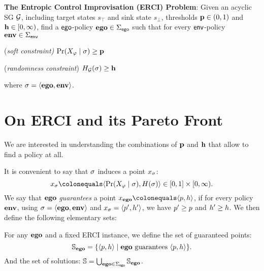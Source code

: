 {{{\begin{mdframed}
\textbf{The Entropic Control Improvisation (ERCI) Problem}:
Given an acyclic SG $\mathcal{G}$, including target states $s_\top$ and sink state $s_\bot$, thresholds $\mathbf{p} \in (0,1)$ and $\mathbf{h} \in [0,\infty)$,  find a $\mathsf{ego}$-policy $\mathbf{ego} \in \Sigma_{\mathsf{ego}}$  such that for every $\mathsf{env}$-policy $\mathbf{env} \in \Sigma_{\mathsf{env}}$ \begin{compactenum}
	\item (\emph{soft constraint)} $\Pr(X_\varphi \mid \sigma) \geq \mathbf{p}$
\item (\emph{randomness constraint}) $H_{\mathcal{G}}(\sigma) \geq \mathbf{h}$
\end{compactenum}
where  $\sigma = \langle \mathbf{ego}, \mathbf{env} \rangle$.
\end{mdframed}

\begin{example}
	
\end{example}


\section{On ERCI and its Pareto Front}

We are interested in understanding the combinations of $\mathbf{p}$ and $\mathbf{h}$ that allow to find a policy at all. 

It is convenient to say that $\sigma$ induces a point $x_\sigma$: \[x_\sched \colonequals \langle \Pr(X_\varphi \mid \sched), H(\sched)  \rangle \in [0,1] \times [0,\infty).\] 
We say that $\mathbf{ego}$ \emph{guarantees} a point $x_\pOneSched \colonequals \langle \scp, \rndp \rangle$, if for every policy $\mathbf{env}$, using $\sigma = \langle \mathbf{ego}, \mathbf{env} \rangle$ and $x_\sigma = \langle p', h' \rangle$, we have $p' \geq p$ and $h' \geq h$.
We then define the following elementary sets:
\begin{definition}
For any $\mathbf{ego}$ and a fixed ERCI instance, we define the set of guaranteed points:
  \[ \mathbb{S}_{\mathbf{ego}} = \{ \langle p, h \rangle \mid  \mathbf{ego} \text{ guarantees } \langle p, h \rangle \}. \]
And the set of solutions:    	
 $ \mathbb{S} = \bigcup_{\mathbf{ego} \in \Sigma_{\mathsf{ego}}} \mathbb{S}_{\mathbf{ego}}$.
\end{definition}

\begin{example}
	
\end{example}

}}}
